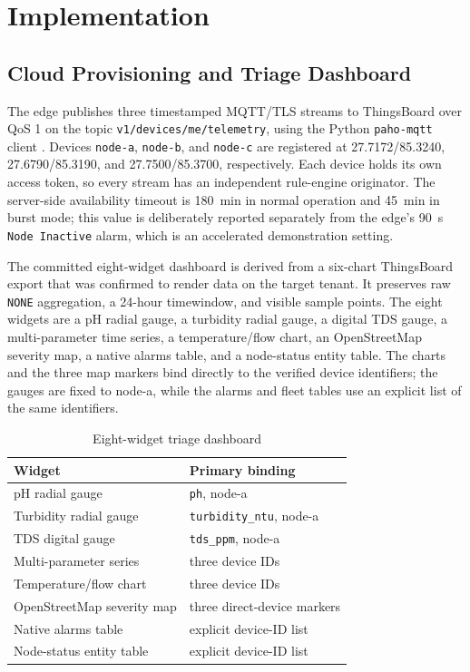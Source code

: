 \documentclass[conference]{IEEEtran}
\begin{document}
\section{Implementation}

\subsection{Cloud Provisioning and Triage Dashboard}
\label{sec:cloud-ux}

The edge publishes three timestamped MQTT/TLS streams to ThingsBoard \cite{TB} over QoS 1
on the topic \texttt{v1/devices/me/telemetry}, using the Python \texttt{paho-mqtt}
client \cite{Paho}. Devices \texttt{node-a}, \texttt{node-b}, and \texttt{node-c} are
registered at 27.7172/85.3240, 27.6790/85.3190, and 27.7500/85.3700, respectively. Each
device holds its own access token, so every stream has an independent rule-engine
originator. The server-side availability timeout is 180~min in normal operation and
45~min in burst mode; this value is deliberately reported separately from the edge's
90~s \texttt{Node Inactive} alarm, which is an accelerated demonstration setting.

The committed eight-widget dashboard is derived from a six-chart ThingsBoard export that
was confirmed to render data on the target tenant. It preserves raw \texttt{NONE}
aggregation, a 24-hour timewindow, and visible sample points. The eight widgets are a pH
radial gauge, a turbidity radial gauge, a digital TDS gauge, a multi-parameter time
series, a temperature/flow chart, an OpenStreetMap severity map, a native alarms table,
and a node-status entity table. The charts and the three map markers bind directly to
the verified device identifiers; the gauges are fixed to node-a, while the alarms and
fleet tables use an explicit list of the same identifiers.

\begin{table}[t]
\caption{Eight-widget triage dashboard}
\label{tab:widgets}
\centering
\scriptsize
\begin{tabular}{@{}ll@{}}
\toprule
Widget & Primary binding \\
\midrule
pH radial gauge & \texttt{ph}, node-a \\
Turbidity radial gauge & \texttt{turbidity\_ntu}, node-a \\
TDS digital gauge & \texttt{tds\_ppm}, node-a \\
Multi-parameter series & three device IDs \\
Temperature/flow chart & three device IDs \\
OpenStreetMap severity map & three direct-device markers \\
Native alarms table & explicit device-ID list \\
Node-status entity table & explicit device-ID list \\
\bottomrule
\end{tabular}
\end{table}
\end{document}
